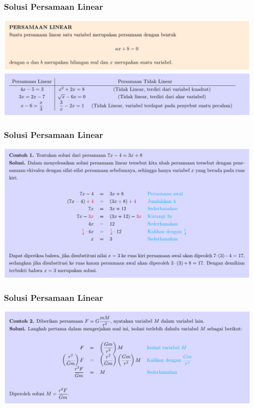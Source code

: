 \documentclass[pdflatex,compress,mathserif]{beamer}
\begin{document}
\begin{frame}
	\frametitle{Solusi Persamaan Linear}
	\begin{center}
		\includegraphics[width=\linewidth]{img/img02}
		\includegraphics[width=\linewidth]{img/img03}
	\end{center}
\end{frame}

\begin{frame}
	\frametitle{Solusi Persamaan Linear}
	\begin{center}
		\includegraphics[width=\linewidth]{img/img04}
	\end{center}
\end{frame}


\begin{frame}
	\frametitle{Solusi Persamaan Linear}
	\begin{center}
		\includegraphics[width=\linewidth]{img/img05}
	\end{center}
\end{frame}
\end{document}
